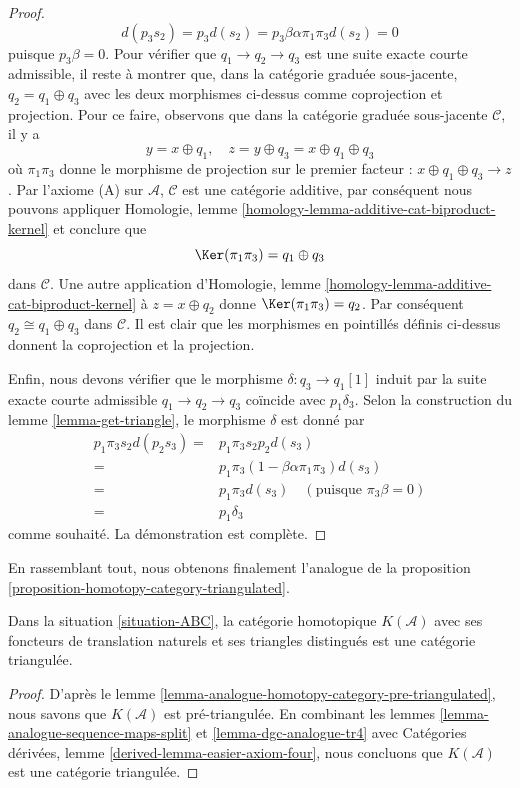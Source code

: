 \begin{proof}
$$
d(p_3s_2) = p_3d(s_2) = p_3\beta\alpha\pi_1\pi_3 d(s_2) = 0
$$
puisque $p_3\beta = 0$. Pour vérifier que $q_1\to q_2\to
q_3$ est une suite exacte courte admissible, il reste à montrer
que, dans la catégorie graduée sous-jacente, $q_2 = q_1\oplus q_3$
avec les deux morphismes ci-dessus comme coprojection et projection.
Pour ce faire, observons que dans la catégorie graduée
sous-jacente $\mathcal{C}$, il y a
$$
y = x\oplus q_1,\quad
z = y\oplus q_3 = x\oplus q_1\oplus q_3
$$
où $\pi_1\pi_3$ donne le morphisme de projection sur le premier
facteur : $x\oplus q_1\oplus q_3\to z$. Par l'axiome (A) sur
$\mathcal{A}$, $\mathcal{C}$ est une catégorie additive, par conséquent
nous pouvons
appliquer Homologie, lemme \ref{homology-lemma-additive-cat-biproduct-kernel}
et conclure que
$$
\Ker(\pi_1\pi_3) = q_1\oplus q_3
$$
dans $\mathcal{C}$. Une autre application
d'Homologie, lemme \ref{homology-lemma-additive-cat-biproduct-kernel} à $z =
x\oplus q_2$ donne $\Ker(\pi_1\pi_3) = q_2$. Par conséquent
$q_2\cong q_1\oplus q_3$ dans $\mathcal{C}$. Il est clair
que les morphismes en pointillés définis ci-dessus donnent la
coprojection et la projection.

\medskip\noindent
Enfin, nous devons vérifier que le morphisme
$\delta : q_3 \to q_1[1]$ induit par la suite exacte
courte admissible $q_1\to q_2\to q_3$ coïncide avec
$p_1\delta_3$. Selon la construction du
lemme \ref{lemma-get-triangle}, le morphisme $\delta$ est donné par
\begin{align*}
p_1\pi_3s_2d(p_2s_3)
= &
p_1\pi_3s_2p_2d(s_3) \\ =
&
p_1\pi_3(1-\beta\alpha\pi_1\pi_3)d(s_3) \\ = &
p_1\pi_3d(s_3)\quad
(\text{puisque }\pi_3\beta = 0) \\ =
&
p_1\delta_3
\end{align*}
comme souhaité. La démonstration est complète.
\end{proof}

\noindent
En rassemblant tout, nous obtenons finalement l'analogue
de la proposition \ref{proposition-homotopy-category-triangulated}.

\begin{proposition}
\label{proposition-ABC-homotopy-category-triangulated}
Dans la situation \ref{situation-ABC}, la catégorie homotopique
$K(\mathcal{A})$ avec ses foncteurs de translation naturels et ses triangles distingués est
une catégorie triangulée.
\end{proposition}

\begin{proof}
D'après le lemme \ref{lemma-analogue-homotopy-category-pre-triangulated}, nous
savons que $K(\mathcal{A})$ est pré-triangulée. En
combinant les lemmes \ref{lemma-analogue-sequence-maps-split}
et \ref{lemma-dgc-analogue-tr4}
avec Catégories dérivées, lemme \ref{derived-lemma-easier-axiom-four},
nous concluons que $K(\mathcal{A})$ est une catégorie triangulée.
\end{proof}

